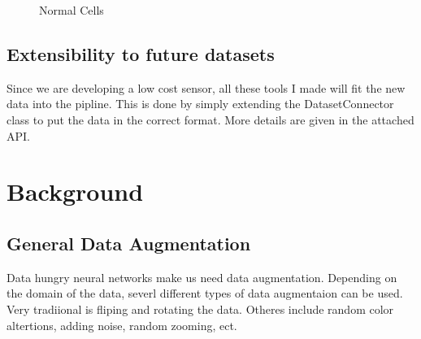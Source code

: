 \documentclass[ms,electronic,oneside,twosidetoc,letterpaper,chaptercenter,parttop]{byumsphd}
\begin{document}
\begin{figure}[H]
  \centering
   \quad
   \quad
  \caption{Normal Cells}
\end{figure}

\section{Extensibility to future datasets}

Since we are developing a low cost sensor, all these tools I made will fit the new data into the pipline. This 
is done by simply extending the DatasetConnector class to put the data in the correct format. More details are given
in the attached API.


\chapter{Background}

\section{General Data Augmentation}

Data hungry neural networks make us need data augmentation. Depending on the domain of the data, severl different types 
of data augmentaion can be used. Very tradiional is fliping and rotating the data. Otheres include random color 
altertions, adding noise, random zooming, ect.
\end{document}
